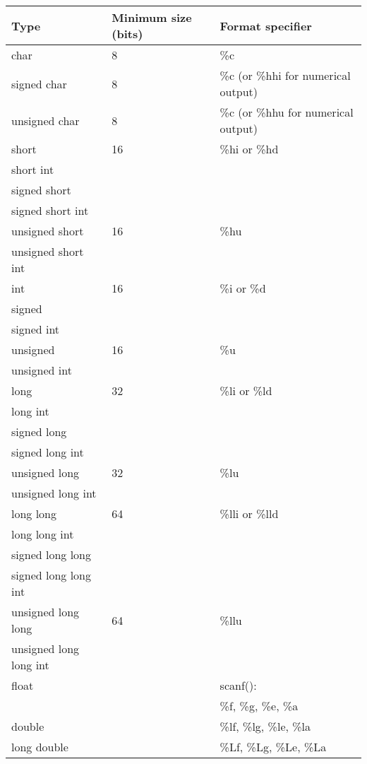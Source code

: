 \begin{frame}[fragile]
\begin{columns}
\begin{column}[c]{0.60\textwidth}
{\tiny
\begin{tabular}{|l|l|l|} \hline
Type & Minimum size (bits) & Format specifier \\ \hline
%
char & 8 & \%c \\ \hline
%
signed char & 8 & \%c (or \%hhi for numerical output) \\ \hline
%
unsigned char & 8 & \%c (or \%hhu for numerical output) \\ \hline
%
short & 16 & \%hi or \%hd \\
short int &  &  \\
signed short &  &  \\
signed short int &  &  \\ \hline
%
unsigned short & 16 & \%hu \\
unsigned short int &  &  \\ \hline
int & 16 & \%i or \%d \\
signed &  &  \\
signed int &  &  \\ \hline
%
unsigned & 16 & \%u \\
unsigned int &  &  \\ \hline
%
long & 32 & \%li or \%ld \\
long int &  &  \\
signed long &  &  \\
signed long int &  &  \\ \hline
%
unsigned long & 32 & \%lu \\
unsigned long int &  &  \\ \hline
long long & 64 & \%lli or \%lld \\
long long int &  &  \\
signed long long &  &  \\
signed long long int &  &  \\ \hline
%
unsigned long long & 64 & \%llu \\
unsigned long long int &  &  \\ \hline
%
float &  & scanf(): \\
 &  & \%f, \%g, \%e, \%a \\ \hline
%
double &  & \%lf, \%lg, \%le, \%la \\ \hline 
%
long double & & \%Lf, \%Lg, \%Le, \%La \\ \hline
\end{tabular}
}
\end{column}

\end{columns}
\end{frame}

